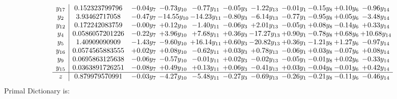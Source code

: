 \documentclass[9pt]{article}
\begin{document}
\[\begin{array}{c| c c@{\hskip 2pt} c@{\hskip 2pt} c@{\hskip 2pt} c@{\hskip 2pt} c@{\hskip 2pt} c@{\hskip 2pt} c@{\hskip 2pt} c@{\hskip 2pt} c@{\hskip 2pt} }
 y_{17}   &  0.152323799796 & -0.04 y_{7} & -0.73 y_{10} & -0.77 y_{11} & -0.05 y_{3} & -1.22 y_{13} & -0.01 y_{1} & -0.15 y_{8} & +  0.10 y_{6} & -0.96 y_{14}\\
 y_{2}   &  3.93462717058 & -0.47 y_{7} & -14.55 y_{10} & -14.23 y_{11} & -0.80 y_{3} & -6.14 y_{13} & -0.77 y_{1} & -0.95 y_{8} & +  0.05 y_{6} & -3.48 y_{14}\\
 y_{12}   &  0.172242083759 & -0.00 y_{7} & +  0.12 y_{10} & -1.40 y_{11} & -0.06 y_{3} & +  2.01 y_{13} & -0.05 y_{1} & +  0.08 y_{8} & -0.14 y_{6} & +  0.33 y_{14}\\
 y_{4}   &  0.0586057201226 & -0.22 y_{7} & +  3.96 y_{10} & +  7.68 y_{11} & +  0.36 y_{3} & -17.27 y_{13} & +  0.90 y_{1} & -0.78 y_{8} & +  0.68 y_{6} & + 10.68 y_{14}\\
 y_{5}   &  1.40909090909 & -1.43 y_{7} & -9.60 y_{10} & + 16.14 y_{11} & +  0.60 y_{3} & -20.82 y_{13} & +  0.36 y_{1} & -1.21 y_{8} & +  1.27 y_{6} & -0.97 y_{14}\\
 y_{16}   &  0.0574565883555 & +  0.02 y_{7} & +  0.08 y_{10} & -0.62 y_{11} & +  0.03 y_{3} & +  0.78 y_{13} & -0.06 y_{1} & +  0.03 y_{8} & -0.07 y_{6} & +  0.08 y_{14}\\
 y_{9}   &  0.0695863125638 & -0.06 y_{7} & -0.57 y_{10} & -0.01 y_{11} & +  0.02 y_{3} & -0.02 y_{13} & -0.05 y_{1} & -0.01 y_{8} & +  0.02 y_{6} & -0.33 y_{14}\\
 y_{15}   &  0.0363891726251 & -0.08 y_{7} & +  0.49 y_{10} & +  0.13 y_{11} & +  0.06 y_{3} & -0.41 y_{13} & +  0.03 y_{1} & -0.04 y_{8} & -0.01 y_{6} & +  0.42 y_{14}\\
\hline
z    &  0.879979570991 & -0.03 y_{7} & -4.27 y_{10} & -5.48 y_{11} & -0.27 y_{3} & -0.69 y_{13} & -0.26 y_{1} & -0.21 y_{8} & -0.11 y_{6} & -0.46 y_{14}\\
\end{array}\]
Primal Dictionary is:
\end{document}
